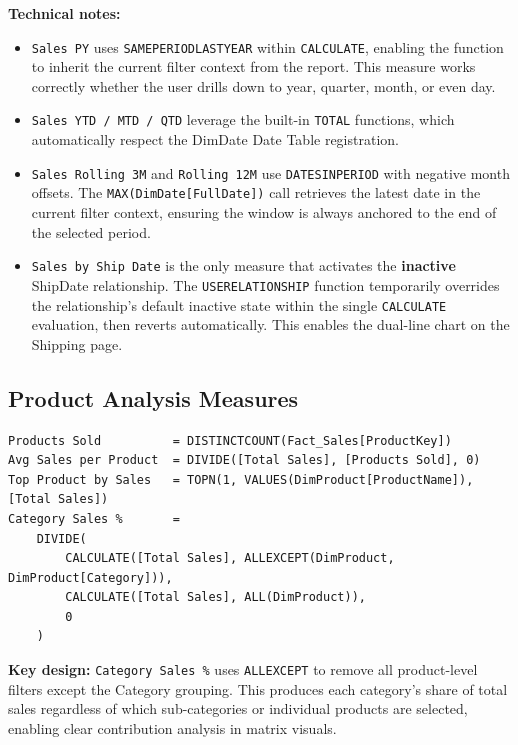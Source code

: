 \documentclass[11pt,a4paper]{article}
\begin{document}
\textbf{Technical notes:}
\begin{itemize}
    \item \texttt{Sales PY} uses \texttt{SAMEPERIODLASTYEAR} within \texttt{CALCULATE}, enabling the function to inherit the current filter context from the report. This measure works correctly whether the user drills down to year, quarter, month, or even day.
    \item \texttt{Sales YTD / MTD / QTD} leverage the built-in \texttt{TOTAL} functions, which automatically respect the DimDate Date Table registration.
    \item \texttt{Sales Rolling 3M} and \texttt{Rolling 12M} use \texttt{DATESINPERIOD} with negative month offsets. The \texttt{MAX(DimDate[FullDate])} call retrieves the latest date in the current filter context, ensuring the window is always anchored to the end of the selected period.
    \item \texttt{Sales by Ship Date} is the only measure that activates the \textbf{inactive} ShipDate relationship. The \texttt{USERELATIONSHIP} function temporarily overrides the relationship's default inactive state within the single \texttt{CALCULATE} evaluation, then reverts automatically. This enables the dual-line chart on the Shipping page.
\end{itemize}

\subsection{Product Analysis Measures}

\begin{lstlisting}
Products Sold          = DISTINCTCOUNT(Fact_Sales[ProductKey])
Avg Sales per Product  = DIVIDE([Total Sales], [Products Sold], 0)
Top Product by Sales   = TOPN(1, VALUES(DimProduct[ProductName]), [Total Sales])
Category Sales %       =
    DIVIDE(
        CALCULATE([Total Sales], ALLEXCEPT(DimProduct, DimProduct[Category])),
        CALCULATE([Total Sales], ALL(DimProduct)),
        0
    )
\end{lstlisting}

\textbf{Key design:} \texttt{Category Sales \%} uses \texttt{ALLEXCEPT} to remove all product-level filters except the Category grouping. This produces each category's share of total sales regardless of which sub-categories or individual products are selected, enabling clear contribution analysis in matrix visuals.
\end{document}
